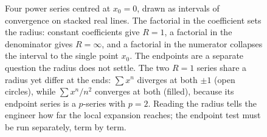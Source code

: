 \begin{figure}[ht]
\begin{tikzpicture}[x=1cm, y=1cm, font=\small]
\end{tikzpicture}
\caption[Intervals of convergence and endpoint verdicts]{Four power
series centred at $x_{0} = 0$, drawn as intervals of convergence on
stacked real lines. The factorial in the coefficient sets the radius:
constant coefficients give $R = 1$, a factorial in the denominator gives
$R = \infty$, and a factorial in the numerator collapses the interval to
the single point $x_{0}$. The endpoints are a separate question the
radius does not settle. The two $R = 1$ series share a radius yet differ
at the ends: $\sum x^{n}$ diverges at both $\pm 1$ (open circles), while
$\sum x^{n}/n^{2}$ converges at both (filled), because its endpoint
series is a $p$-series with $p = 2$. Reading the radius tells the
engineer how far the local expansion reaches; the endpoint test must be
run separately, term by term.}
\label{fig:vol02:ch04:interval-endpoints}
\end{figure}
